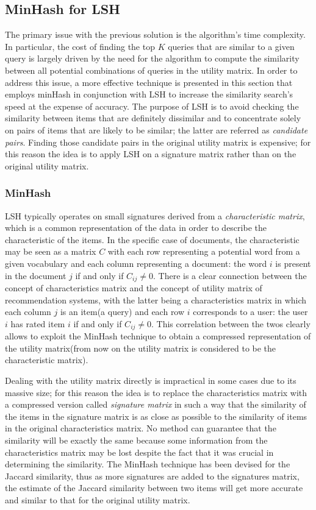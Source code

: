 \subsection{MinHash for LSH}
\label{minhash_section}
The primary issue with the previous solution is the algorithm's time complexity. In particular, the cost of finding the top $K$ queries that are similar to a given query is largely driven by the need for the algorithm to compute the similarity between all potential combinations of queries in the utility matrix. In order to address this issue, a more effective technique is presented in this section that employs minHash\cite{minhash} in conjunction with LSH to increase the similarity search's speed at the expense of accuracy. The purpose of LSH is to avoid checking the similarity between items that are definitely dissimilar and to concentrate solely on pairs of items that are likely to be similar; the latter are referred as \emph{candidate pairs}. Finding those candidate pairs in the original utility matrix is expensive; for this reason the idea is to apply LSH on a signature matrix rather than on the original utility matrix.

\subsubsection{MinHash} LSH typically operates on small signatures derived from a \emph{characteristic matrix}, which is a common representation of the data in order to describe the characteristic of the items. In the specific case of documents, the characteristic may be seen as a matrix $C$ with each row representing a potential word from a given vocabulary and each column representing a document: the word $i$ is present in the document $j$ if and only if $C_{ij} \neq 0$. There is a clear connection between the concept of characteristics matrix and the concept of utility matrix of recommendation systems, with the latter being a characteristics matrix in which each column $j$ is an item(a query) and each row $i$ corresponds to a user: the user $i$ has rated item $i$ if and only if $C_{ij} \neq 0$. This correlation between the twos clearly allows to exploit the MinHash technique to obtain a compressed representation of the utility matrix(from now on the utility matrix is considered to be the characteristic matrix). 

Dealing with the utility matrix directly is impractical in some cases due to its massive size; for this reason the idea is to replace the characteristics matrix with a compressed version called \emph{signature matrix} in such a way that the similarity of the items in the signature matrix is as close as possible to the similarity of items in the original characteristics matrix. No method can guarantee that the similarity will be exactly the same because some information from the characteristics matrix may be lost despite the fact that it was crucial in determining the similarity. The MinHash technique\cite{minhash} has been devised for the Jaccard similarity, thus as more signatures are added to the signatures matrix, the estimate of the Jaccard similarity between two items will get more accurate and similar to that for the original utility matrix.


